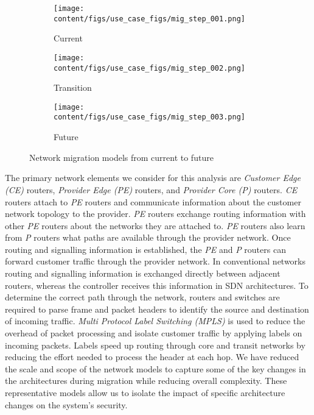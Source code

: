 

\begin{figure*}[ht]
\centering
\begin{subfigure}{.33\textwidth}
\texttt{[image: content/figs/use\_case\_figs/mig\_step\_001.png]}
\caption{Current}
\label{fig:current}
\end{subfigure}%
\begin{subfigure}{.33\textwidth}
\texttt{[image: content/figs/use\_case\_figs/mig\_step\_002.png]}
\caption{Transition}
\label{fig:trans}
\end{subfigure}%
\begin{subfigure}{.33\textwidth}
\texttt{[image: content/figs/use\_case\_figs/mig\_step\_003.png]}
\caption{Future}
\label{fig:future}
\end{subfigure}%
    \caption{Network migration models from current to future}
\end{figure*} 


The primary network elements we consider for this analysis are \textit{Customer Edge (CE)} routers, \textit{Provider Edge (PE)} routers, and \textit{Provider Core (P)} routers. \textit{CE} routers attach to \textit{PE} routers and communicate information about the customer network  topology to the provider. \textit{PE} routers exchange routing information with other \textit{PE} routers about the networks they are attached to. \textit{PE} routers also learn from \textit{P} routers what paths are available through the provider network.  Once routing and signalling information is established, the \textit{PE} and \textit{P} routers can forward customer traffic through the provider network. In conventional networks routing and signalling information is exchanged directly between adjacent routers, whereas the controller receives this information in SDN architectures. To determine the correct path through the network, routers and switches are required to parse frame and packet headers to identify the source and destination of incoming traffic. \textit{Multi Protocol Label Switching (MPLS)}\cite{Awduche_Agogbua_1999} is used to reduce the overhead of packet processing and isolate customer traffic by applying labels on incoming packets. Labels speed up routing through core and transit networks by reducing the effort needed to process the header at each hop. We have reduced the scale and scope of the network models to capture some of the key changes in the architectures during migration while reducing overall complexity. These representative models allow us to isolate the impact of specific architecture changes on the system’s security.  %


